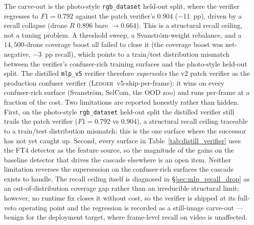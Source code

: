 \documentclass[12pt,a4paper,oneside,openright]{book}
\begin{document}
The carve-out is the photo-style \texttt{rgb\_dataset} held-out split, where the verifier regresses to $F1=0.792$ against the patch verifier's $0.904$ ($-11$~pp), driven by a recall collapse (drone $R$ $0.896$ bare $\to 0.664$). This is a structural recall ceiling, not a tuning problem. A threshold sweep, a Svanstr\"om-weight rebalance, and a $14{,}500$-drone coverage boost all failed to close it (the coverage boost was net-negative, $-3$~pp recall), which points to a train/test distribution mismatch between the verifier's confuser-rich training surfaces and the photo-style held-out split. The distilled \texttt{mlp\_v5} verifier therefore \emph{supersedes} the v2 patch verifier as the production confuser verifier (\textsc{Ledger}~v5-ship-per-frame): it wins on every confuser-rich surface (Svanstr\"om, SelCom, the OOD zoo) and runs per-frame at a fraction of the cost. Two limitations are reported honestly rather than hidden. First, on the photo-style \texttt{rgb\_dataset} held-out split the distilled verifier still trails the patch verifier ($F1=0.792$ vs $0.904$), a structural recall ceiling traceable to a train/test distribution mismatch; this is the one surface where the successor has not yet caught up. Second, every surface in Table~\ref{tab:distill_verifier} uses the FT4 detector as the feature source, so the magnitude of the gains on the baseline detector that drives the cascade elsewhere is an open item. Neither limitation reverses the supersession on the confuser-rich surfaces the cascade exists to handle. The recall ceiling itself is diagnosed in \S\ref{sec:mlp_recall_drop} as an out-of-distribution coverage gap rather than an irreducible structural limit; however, no runtime fix closes it without cost, so the verifier is shipped at its full-veto operating point and the regression is recorded as a still-image carve-out --- benign for the deployment target, where frame-level recall on video is unaffected.
\end{document}
